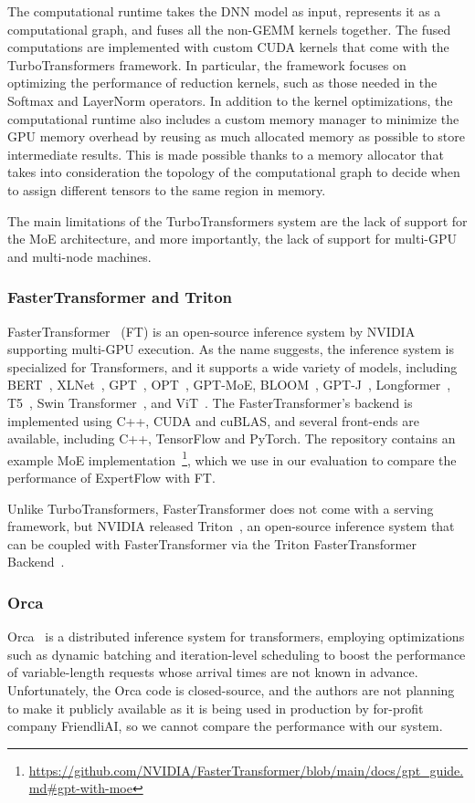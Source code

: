 The computational runtime takes the DNN model as input, represents it as a computational graph, and fuses all the non-GEMM kernels together. The fused computations are implemented with custom CUDA kernels that come with the TurboTransformers framework. In particular, the framework focuses on optimizing the performance of reduction kernels, such as those needed in the Softmax and LayerNorm operators. In addition to the kernel optimizations, the computational runtime also includes a custom memory manager to minimize the GPU memory overhead by reusing as much allocated memory as possible to store intermediate results. This is made possible thanks to a memory allocator that takes into consideration the topology of the computational graph to decide when to assign different tensors to the same region in memory.

The main limitations of the TurboTransformers system are the lack of support for the MoE architecture, and more importantly, the lack of support for multi-GPU and multi-node machines.


\subsubsection{FasterTransformer and Triton}
FasterTransformer~\cite{faster_transformer} (FT) is an open-source inference system by NVIDIA supporting multi-GPU execution. As the name suggests, the inference system is specialized for Transformers, and it supports a wide variety of models, including BERT~\cite{bert}, XLNet~\cite{xlnet}, GPT~\cite{gpt1, gpt2, brown_2020}, OPT~\cite{opt}, GPT-MoE, BLOOM~\cite{bloom}, GPT-J~\cite{gpt-j}, Longformer~\cite{longformer}, T5~\cite{t5}, Swin Transformer~\cite{swin-transformer}, and ViT~\cite{vit}. The FasterTransformer's backend is implemented using C++, CUDA and cuBLAS, and several front-ends are available, including C++, TensorFlow and PyTorch. The repository contains an example MoE implementation~\footnote{\url{https://github.com/NVIDIA/FasterTransformer/blob/main/docs/gpt\_guide.md\#gpt-with-moe}}, which we use in our evaluation to compare the performance of ExpertFlow with FT. 

Unlike TurboTransformers, FasterTransformer does not come with a serving framework, but NVIDIA released Triton~\cite{triton}, an open-source inference system that can be coupled with FasterTransformer via the Triton FasterTransformer Backend~\cite{triton-ft-backend}.

\subsubsection{Orca}
Orca~\cite{orca} is a distributed inference system for transformers, employing optimizations such as dynamic batching and iteration-level scheduling to boost the performance of variable-length requests whose arrival times are not known in advance. Unfortunately, the Orca code is closed-source, and the authors are not planning to make it publicly available as it is being used in production by for-profit company FriendliAI, so we cannot compare the performance with our system. 


